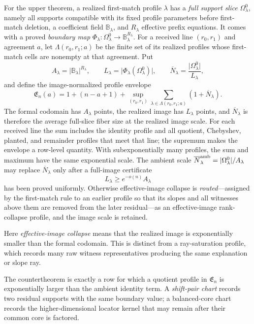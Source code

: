 \documentclass[12pt,a4paper]{amsart}
\numberwithin{equation}{section}
\theoremstyle{remark}
\newcommand{\B}{\mathbb B}
\newcommand{\barN}{\overline N}
\newcommand{\abs}[1]{\lvert #1\rvert}
\begin{document}
For the upper theorem, a realized first-match profile \(\lambda\) has a
\emph{full support slice} \(\Omega^0_\lambda\), namely all supports
compatible with its fixed profile parameters before first-match deletion,
a coefficient field \(\B_\lambda\), and \(R_\lambda\) effective prefix
equations.  It comes with a proved \emph{boundary map}
\(\Phi_\lambda:\Omega^0_\lambda\to\B_\lambda^{R_\lambda}\).
For a received line \((r_0,r_1)\) and agreement \(a\), let
\(\Lambda(r_0,r_1;a)\) be the finite set of its realized profiles whose
first-match cells are nonempty at that agreement.  Put
\[
 A_\lambda=\abs{\B_\lambda}^{R_\lambda},\qquad
 L_\lambda=\abs{\Phi_\lambda(\Omega^0_\lambda)},\qquad
 \barN_\lambda=\frac{\abs{\Omega^0_\lambda}}{L_\lambda},
\]
and define the image-normalized profile envelope
\[
 \mathfrak E_n(a)=1+(n-a+1)+
 \sup_{(r_0,r_1)}
 \sum_{\lambda\in\Lambda(r_0,r_1;a)}(1+\barN_\lambda).
 \tag{1.4}\label{eq:profile-envelope}
\]
The formal codomain has \(A_\lambda\) points, the realized image has
\(L_\lambda\) points, and \(\barN_\lambda\) is therefore the average
full-slice fiber size at the realized image scale.  For each received line
the sum includes the identity profile and all
quotient, Chebyshev, planted, and remainder profiles that meet that line;
the supremum makes the envelope a row-level quantity.  With subexponentially
many profiles, the sum and maximum have the same exponential scale.  The
ambient scale
\(\barN_\lambda^{\rm amb}=|\Omega^0_\lambda|/A_\lambda\) may replace
\(\barN_\lambda\) only after a full-image certificate
\[
 L_\lambda\ge e^{-o(n)}A_\lambda                       \tag{FI}
\]
has been proved uniformly.  Otherwise effective-image collapse is
\emph{routed}---assigned by the first-match rule to an earlier profile so
that its slopes and all witnesses above them are removed from the later
residual---as an effective-image rank-collapse profile, and the image scale
is retained.

Here
\emph{effective-image collapse} means that the realized image is
exponentially smaller than the formal codomain.  This is distinct from a
ray-saturation profile, which records many raw witness representatives
producing the same explanation or slope ray.

The countertheorem is exactly a row for which a quotient profile in
\(\mathfrak E_n\) is exponentially larger than the ambient identity term.
A \emph{shift-pair chart} records two residual supports with the same
boundary value; a balanced-core chart records the higher-dimensional
locator kernel that may remain after their common core is factored.
\end{document}

